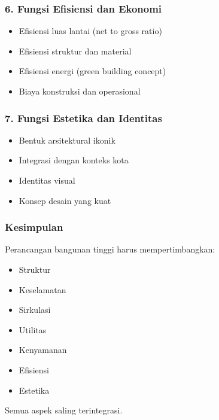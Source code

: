 \documentclass[../skb.tex]{subfiles}
\begin{document}
\begin{frame}[t,mycolor=digiPH_leaf,mytitle=standard,dark]
	\frametitle{6. Fungsi Efisiensi dan Ekonomi}

	\begin{itemize}
		\item Efisiensi luas lantai (net to gross ratio)
		\item Efisiensi struktur dan material
		\item Efisiensi energi (green building concept)
		\item Biaya konstruksi dan operasional
	\end{itemize}

\end{frame}

\begin{frame}[t,mycolor=digiPH_leaf,mytitle=standard,dark]
	\frametitle{7. Fungsi Estetika dan Identitas}

	\begin{itemize}
		\item Bentuk arsitektural ikonik
		\item Integrasi dengan konteks kota
		\item Identitas visual
		\item Konsep desain yang kuat
	\end{itemize}

\end{frame}

\begin{frame}[t,mycolor=digiPH_leaf,mytitle=standard,dark]
	\frametitle{Kesimpulan}

	Perancangan bangunan tinggi harus mempertimbangkan:

	\begin{itemize}
		\item Struktur
		\item Keselamatan
		\item Sirkulasi
		\item Utilitas
		\item Kenyamanan
		\item Efisiensi
		\item Estetika
	\end{itemize}

	Semua aspek saling terintegrasi.

\end{frame}


\begin{frame}[c,mybg=pg_3,mytitle=standard,dark]\end{frame}
\begin{frame}[c,mybg=pg_4,mytitle=standard,dark]\end{frame}
\end{document}

